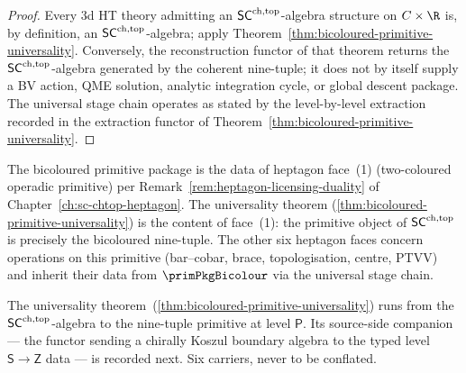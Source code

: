 \begin{proof}
Every $3$d HT theory admitting an $\mathsf{SC}^{\mathrm{ch},\mathrm{top}}$-algebra structure on
$C \times \R$ is, by definition, an $\mathsf{SC}^{\mathrm{ch},\mathrm{top}}$-algebra; apply
Theorem~\ref{thm:bicoloured-primitive-universality}. Conversely, the
reconstruction functor of that theorem returns the
$\mathsf{SC}^{\mathrm{ch},\mathrm{top}}$-algebra generated by the coherent nine-tuple; it does not by
itself supply a BV action, QME solution, analytic integration cycle, or
global descent package. The universal stage chain operates as stated by
the level-by-level extraction recorded in
the extraction functor of
Theorem~\ref{thm:bicoloured-primitive-universality}.
\end{proof}

\begin{remark}
\label{rem:bicoloured-universality-and-heptagon}
The bicoloured primitive package is the data of heptagon face~(1)
(two-coloured operadic primitive) per
Remark~\ref{rem:heptagon-licensing-duality} of
Chapter~\ref{ch:sc-chtop-heptagon}. The universality theorem
\textup(\ref{thm:bicoloured-primitive-universality}\textup) is the
content of face~(1): the primitive object of $\mathsf{SC}^{\mathrm{ch},\mathrm{top}}$ is precisely
the bicoloured nine-tuple. The other six heptagon faces concern
operations on this primitive (bar--cobar, brace, topologisation,
centre, PTVV) and inherit their data from
$\primPkgBicolour$ via the universal stage chain.
\end{remark}


The universality theorem~(\cref{thm:bicoloured-primitive-universality})
runs from the $\mathsf{SC}^{\mathrm{ch},\mathrm{top}}$-algebra to the nine-tuple primitive at level
$\mathsf{P}$.  Its source-side companion --- the functor sending a
chirally Koszul boundary algebra to the typed level
$\mathsf{S} \to \mathsf{Z}$ data --- is recorded next.  Six carriers,
never to be conflated.

